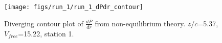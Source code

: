 \begin{figure}[H]
\centering
\texttt{[image: figs/run\_1/run\_1\_dPdr\_contour]}
\caption{Diverging contour plot of $\frac{d\bar{P}}{dr}$ from non-equilibrium theory. $z/c$=5.37, $V_{free}$=15.22, station 1.}
\label{fig:run_1_dPdr_contour}
\end{figure}


